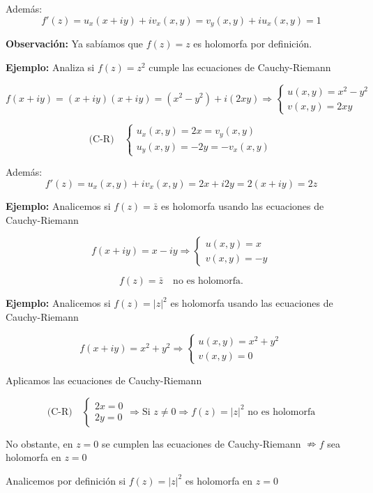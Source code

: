\documentclass[a4paper,12pt]{article}
\begin{document}
Además:
\[
f'(z) = u_x(x + iy) + i v_x(x, y) = v_y(x, y) + i u_x(x, y) = 1
\]

\textbf{Observación:} Ya sabíamos que $f(z) = z$ es holomorfa por definición.

\noindent\textbf{Ejemplo:} Analiza si $f(z) = z^2$ cumple las ecuaciones de Cauchy-Riemann

\[
f(x + iy) = (x + iy)(x + iy) = (x^2 - y^2) + i (2xy) \Rightarrow
\begin{cases}
u(x, y) = x^2 - y^2 \\
v(x, y) = 2xy
\end{cases}
\]

\[
\text{(C-R)} \quad
\begin{cases}
u_x(x, y) = 2x = v_y(x, y) \\
u_y(x, y) = -2y = -v_x(x, y)
\end{cases}
\]

Además:
\[
f'(z) = u_x(x, y) + i v_x(x, y) = 2x + i 2y = 2(x + iy) = 2z
\]

\noindent\textbf{Ejemplo:} Analicemos si $f(z) = \bar{z}$ es holomorfa usando las ecuaciones de Cauchy-Riemann

\[
f(x + iy) = x - iy \Rightarrow
\begin{cases}
u(x, y) = x \\
v(x, y) = -y
\end{cases}
\]

\[
f(z) = \bar{z} \quad \text{no es holomorfa.}
\]

\noindent\textbf{Ejemplo:} Analicemos si $f(z) = |z|^2$ es holomorfa usando las ecuaciones de Cauchy-Riemann

\[
f(x + iy) = x^2 + y^2 \Rightarrow 
\begin{cases}
u(x, y) = x^2 + y^2 \\
v(x, y) = 0
\end{cases}
\]

Aplicamos las ecuaciones de Cauchy-Riemann

\[
\text{(C-R)} \quad 
\begin{cases}
2x = 0 \\
2y = 0
\end{cases}
\Rightarrow \text{Si } z \neq 0 \Rightarrow f(z) = |z|^2 \text{ no es holomorfa}
\]

No obstante, en $z = 0$ se cumplen las ecuaciones de Cauchy-Riemann $\nRightarrow f$ sea holomorfa en $z = 0$

Analicemos por definición si $f(z) = |z|^2$ es holomorfa en $z = 0$
\end{document}

